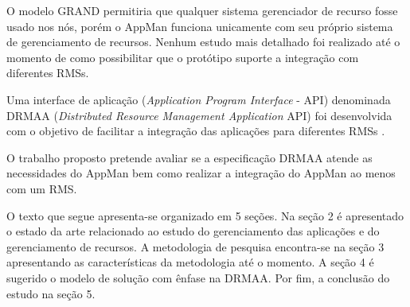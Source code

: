 O modelo GRAND permitiria que qualquer sistema gerenciador de recurso fosse usado nos nós, porém o AppMan funciona unicamente com seu próprio sistema de gerenciamento de recursos. Nenhum estudo mais detalhado foi realizado até o momento de como possibilitar que o protótipo suporte a integração com diferentes RMSs.

Uma interface de aplicação (\emph{Application Program Interface} - API) denominada DRMAA (\emph{Distributed Resource Management Application} API) foi desenvolvida com o objetivo de facilitar a integração das aplicações para diferentes RMSs \cite{Rajic2004}.

O trabalho proposto pretende avaliar se a especificação DRMAA atende as necessidades do AppMan bem como realizar a integração do AppMan ao menos com um RMS.

O texto que segue apresenta-se organizado em 5 seções. Na seção 2 é apresentado o estado da arte relacionado ao estudo do gerenciamento das aplicações e do gerenciamento de recursos. A metodologia de pesquisa encontra-se na seção 3 apresentando as características da metodologia até o momento. A seção 4 é sugerido o modelo de solução com ênfase na DRMAA. Por fim, a conclusão do estudo na seção 5.
